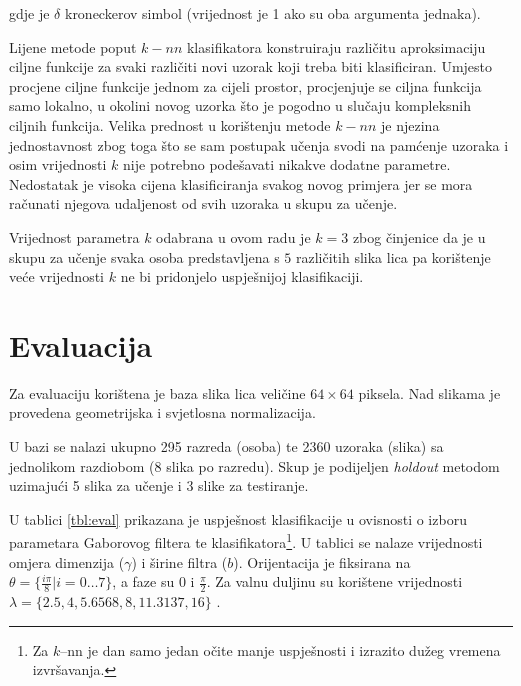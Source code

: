 \documentclass{ru}
\begin{document}
gdje je $\delta$ kroneckerov simbol (vrijednost je 1 ako su oba argumenta jednaka).


Lijene metode poput $k-nn$ klasifikatora konstruiraju različitu aproksimaciju
ciljne funkcije za svaki različiti novi uzorak koji treba biti klasificiran. Umjesto
procjene ciljne funkcije jednom za cijeli prostor, procjenjuje se ciljna funkcija
samo lokalno, u okolini novog uzorka što je pogodno u slučaju kompleksnih ciljnih
funkcija. Velika prednost u korištenju metode $k-nn$ je njezina jednostavnost
zbog toga što se sam postupak učenja svodi na pamćenje uzoraka i osim vrijednosti
$k$ nije potrebno podešavati nikakve dodatne parametre. Nedostatak je visoka
cijena klasificiranja svakog novog primjera jer se mora računati njegova
udaljenost od svih uzoraka u skupu za učenje.

Vrijednost parametra $k$ odabrana u ovom radu je $k = 3$ zbog činjenice da je u
skupu za učenje svaka osoba predstavljena s $5$ različitih slika lica pa
korištenje veće vrijednosti $k$ ne bi pridonjelo uspješnijoj klasifikaciji.

\chapter{Evaluacija}
\label{ch:eval}
Za evaluaciju korištena je baza slika lica veličine $64 \times 64$ piksela. Nad
slikama je provedena geometrijska i svjetlosna normalizacija. 

U bazi se nalazi ukupno 295 razreda (osoba) te 2360 uzoraka (slika) sa
jednolikom razdiobom (8 slika po razredu). Skup je podijeljen \emph{holdout} metodom
uzimajući 5 slika za učenje i 3 slike za testiranje.

U tablici \ref{tbl:eval} prikazana je uspješnost klasifikacije u ovisnosti o izboru
parametara Gaborovog filtera te klasifikatora\footnote{Za $k$--nn je dan samo
jedan očite manje uspješnosti i izrazito dužeg vremena izvršavanja.}. U tablici
se nalaze vrijednosti omjera dimenzija ($\gamma$) i širine filtra ($b$).
Orijentacija je fiksirana na $\theta = \{ \frac{i \pi}{8} | i =
0 \ldots 7\}$, a faze su $0$ i $\frac{\pi}{2}$. Za valnu duljinu su korištene
vrijednosti $\lambda = \{2.5, 4, 5.6568, 8, 11.3137, 16\}$
\citep{shen2007gabor}.
\end{document}
